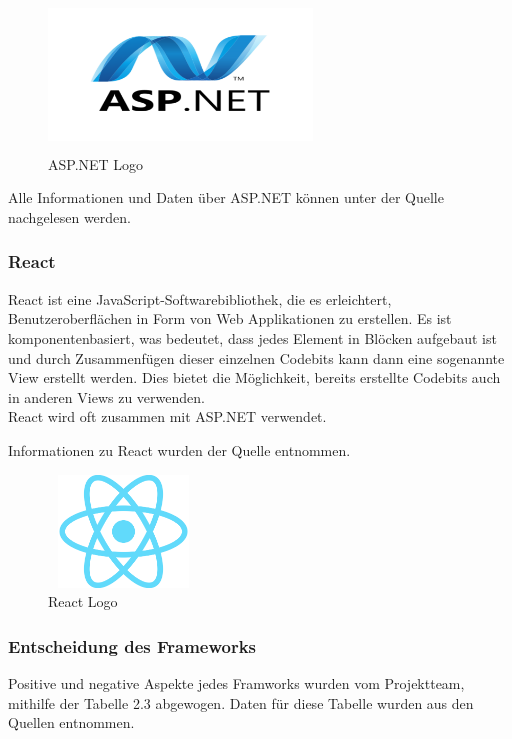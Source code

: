 \begin{figure}[h]
	\centering
	\includegraphics[height=4cm,width=7cm]{images/ASP.net_Logo}
	\caption{ASP.NET Logo}
	\label{fig:ASP.net Logo}
\end{figure}


Alle Informationen und Daten über ASP.NET können unter der Quelle \cite{ASPNET} nachgelesen werden.

\subsubsection{React}
React ist eine JavaScript-Softwarebibliothek, die es erleichtert, Benutzeroberflächen in Form von Web Applikationen zu erstellen. Es ist komponentenbasiert, was bedeutet, dass jedes Element in Blöcken aufgebaut ist und durch Zusammenfügen dieser einzelnen Codebits kann dann eine sogenannte View erstellt werden. Dies bietet die Möglichkeit, bereits erstellte Codebits auch in anderen Views zu verwenden.\\ React wird oft zusammen mit ASP.NET verwendet.


Informationen zu React wurden der Quelle \cite{React} entnommen.
\begin{figure}[h]
	\centering
	\includegraphics[height=3cm,width=4cm]{images/React_Logo}
	\caption{React Logo}
	\label{fig:React Logo}
\end{figure}
\newpage

\subsubsection{Entscheidung des Frameworks}\label{sec:Entscheidung des Frameworks}
Positive und negative Aspekte jedes Framworks wurden vom Projektteam, mithilfe der Tabelle 2.3 abgewogen. Daten für diese Tabelle wurden aus den Quellen \cite{VorundNachteile1, VorundNachteile2, VorundNachteile3, VorundNachteile4}  entnommen.


